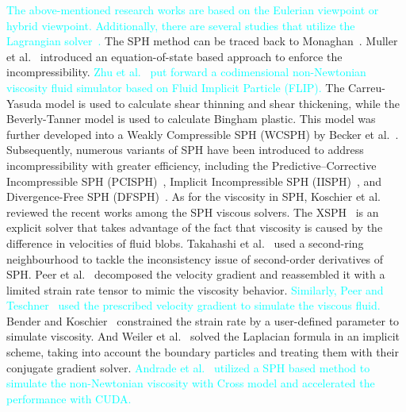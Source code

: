 \documentclass[10pt,journal,compsoc]{IEEEtran}
\newcommand{\revised}[1]{{\textcolor{cyan}{#1}}}
\begin{document}
\revised{The above-mentioned research works are based on the Eulerian viewpoint or hybrid viewpoint. Additionally, there are several studies that utilize the Lagrangian solver~\cite{Muller2004-elastic-plastic-melting,Solenthaler2007}.} The SPH method can be traced back to Monaghan~\cite{Monaghan1992}. Muller et al.~\cite{Muller03-SPH} introduced an equation-of-state based approach to enforce the incompressibility. \revised{Zhu et al.~\cite{Zhu2015-nonNewton} put forward a codimensional non-Newtonian viscosity fluid simulator based on Fluid Implicit Particle (FLIP).} The Carreu-Yasuda model is used to calculate shear thinning and shear thickening, while the Beverly-Tanner model is used to calculate Bingham plastic. This model was further developed into a Weakly Compressible SPH (WCSPH) by Becker et al.~\cite{Becker2007-WCSPH}. Subsequently, numerous variants of SPH have been introduced to address incompressibility with greater efficiency, including the Predictive–Corrective Incompressible SPH (PCISPH)~\cite{Solenthaler2009-PCISPH}, Implicit Incompressible SPH (IISPH)~\cite{Ihmsen14-IISPH}, and Divergence-Free SPH (DFSPH)~\cite{Bender2017-DFSPH}. As for the viscosity in SPH, Koschier et al.~\cite{Koschier2019-Tut} reviewed the recent works among the SPH viscous solvers. The XSPH~\cite {Monaghan1992,Bridson2012-XSPH} is an explicit solver that takes advantage of the fact that viscosity is caused by the difference in velocities of fluid blobs. Takahashi et al.~\cite{Takahashi2015} used a second-ring neighbourhood to tackle the inconsistency issue of second-order derivatives of SPH. Peer et al.~\cite{Peer2015} decomposed the velocity gradient and reassembled it with a limited strain rate tensor to mimic the viscosity behavior. \revised{ Similarly, Peer and Teschner~\cite{Peer2017-Prescribed} used the prescribed velocity gradient to simulate the viscous fluid.}  Bender and Koschier~\cite{Bender2017-DFSPH} constrained the strain rate by a user-defined parameter to simulate viscosity. And Weiler et al.~\cite{Weiler2018-viscosity} solved the Laplacian formula in an implicit scheme, taking into account the boundary particles and treating them with their conjugate gradient solver.   \revised{Andrade et al.~\cite{Andrade2015} utilized a SPH based method to simulate the non-Newtonian viscosity with Cross model and accelerated the performance with CUDA.}
\end{document}
